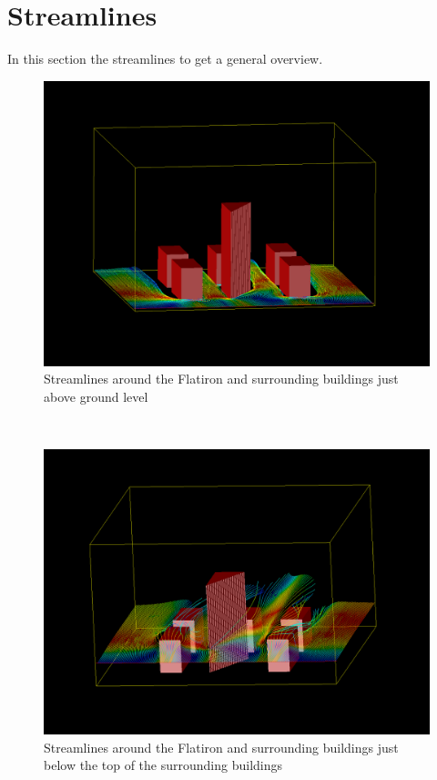 \section{Streamlines}
\label{sec:streamlines}
In this section the streamlines to get a general overview. \\
\begin{figure}[h]
\centering
\includegraphics[width =  \textwidth]{streamlinesbottom.png}
\caption{Streamlines around the Flatiron and surrounding buildings just above ground level}
\label{fig:streamlinesbottom}
\end{figure}\\
\begin{figure}[h]
\centering
\includegraphics[width = \textwidth]{streamlinesmid.png}
\caption{Streamlines around the Flatiron and surrounding buildings just below the top of the surrounding buildings}
\label{fig:streamlinesmid}
\end{figure}\\
